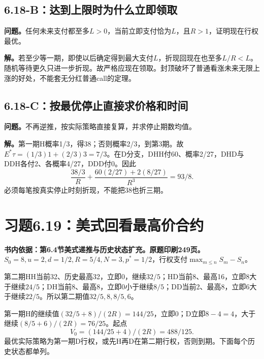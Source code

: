 \documentclass[11pt,a4paper,UTF8,fontset=fandol]{ctexart}
\begin{document}
\subsection{6.18-B：达到上限时为什么立即领取}\label{bux8fbeux5230ux4e0aux9650ux65f6ux4e3aux4ec0ux4e48ux7acbux5373ux9886ux53d6}

\textbf{问题。}任何未来支付都至多\(L>0\)，当前立即支付恰为\(L\)，且\(R>1\)，证明现在行权最优。

\textbf{解。}若至少等一期，即使以后确定得到最大支付\(L\)，折现回现在也至多\(L/R<L\)。随机等待更久只进一步折现。故严格应现在领取。封顶破坏了普通看涨未来无限上涨的好处，不能套无分红普通call的定理。

\subsection{6.18-C：按最优停止直接求价格和时间}\label{cux6309ux6700ux4f18ux505cux6b62ux76f4ux63a5ux6c42ux4ef7ux683cux548cux65f6ux95f4}

\textbf{问题。}不再逆推，按实际策略直接复算，并求停止期数均值。

\textbf{解。}第一期H概率1/3，得38；否则概率2/3，到第3期。故\(E^*\tau=(1/3)1+(2/3)3=\boxed{7/3}\)。在D分支，DHH付60、概率2/27，DHD与DDH各付2、各概率4/27，DDD付0。因此
\[\frac{38/3}{R}+\frac{60(2/27)+2(8/27)}{R^3}=\boxed{93/8}.\]
必须每笔按真实停止时刻折现，不能把38也折三期。

\bigskip

\section{习题6.19：美式回看最高价合约}\label{ux4e60ux98986.19ux7f8eux5f0fux56deux770bux6700ux9ad8ux4ef7ux5408ux7ea6}

\textbf{书内依据：第6.4节美式递推与历史状态扩充。原题印刷249页。}\(S_0=8,u=2,d=1/2,R=5/4,N=3,p^*=1/2\)，行权支付\(\max_{m\le n}S_m-S_n\)。

第二期HH当前32、历史最高32，立即0，继续\(32/5\)；HD当前8、最高16，立即8大于继续\(24/5\)；DH当前8、最高8，立即0小于继续\(8/5\)；DD当前2、最高8，立即6大于继续\(22/5\)。所以第二期值\(32/5,8,8/5,6\)。

第一期H的继续值\((32/5+8)/(2R)=144/25\)，立即0；D立即\(8-4=4\)，大于继续\((8/5+6)/(2R)=76/25\)。起点
\[\boxed{V_0=(144/25+4)/(2R)=488/125.}\]
最优实际策略为第一期D行权，或先H再D在第二期行权，否则到期。下面每个历史状态都单列。

\begingroup
\small
\setlength{\tabcolsep}{4pt}
\renewcommand{\arraystretch}{1.10}
\end{document}
